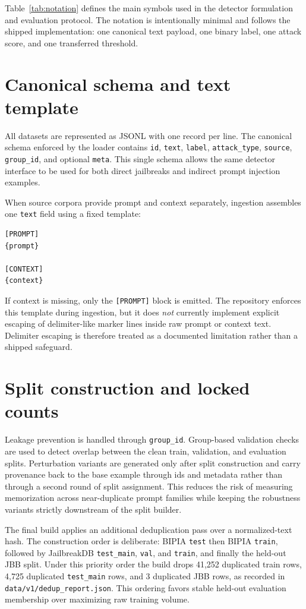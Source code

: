 Table~\ref{tab:notation} defines the main symbols used in the detector formulation and evaluation protocol. The notation is intentionally minimal and follows the shipped implementation: one canonical text payload, one binary label, one attack score, and one transferred threshold.



\section{Canonical schema and text template}

All datasets are represented as JSONL with one record per line. The canonical schema enforced by the loader contains \texttt{id}, \texttt{text}, \texttt{label}, \texttt{attack\_type}, \texttt{source}, \texttt{group\_id}, and optional \texttt{meta}. This single schema allows the same detector interface to be used for both direct jailbreaks and indirect prompt injection examples.

When source corpora provide prompt and context separately, ingestion assembles one \texttt{text} field using a fixed template:
\begin{verbatim}
[PROMPT]
{prompt}

[CONTEXT]
{context}
\end{verbatim}
If context is missing, only the \texttt{[PROMPT]} block is emitted. The repository enforces this template during ingestion, but it does \emph{not} currently implement explicit escaping of delimiter-like marker lines inside raw prompt or context text. Delimiter escaping is therefore treated as a documented limitation rather than a shipped safeguard.

\section{Split construction and locked counts}

Leakage prevention is handled through \texttt{group\_id}. Group-based validation checks are used to detect overlap between the clean train, validation, and evaluation splits. Perturbation variants are generated only after split construction and carry provenance back to the base example through ids and metadata rather than through a second round of split assignment. This reduces the risk of measuring memorization across near-duplicate prompt families while keeping the robustness variants strictly downstream of the split builder.

The final build applies an additional deduplication pass over a normalized-text hash. The construction order is deliberate: BIPIA \texttt{test} then BIPIA \texttt{train}, followed by JailbreakDB \texttt{test\_main}, \texttt{val}, and \texttt{train}, and finally the held-out JBB split. Under this priority order the build drops 41,252 duplicated train rows, 4,725 duplicated \texttt{test\_main} rows, and 3 duplicated JBB rows, as recorded in \texttt{data/v1/dedup\_report.json}. This ordering favors stable held-out evaluation membership over maximizing raw training volume.

